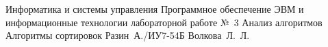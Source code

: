 \documentclass{bmstu}[a4paper]
\begin{document}
	
	\makereporttitle
	{Информатика и системы управления} %
	{Программное обеспечение ЭВМ и информационные технологии} %
	{лабораторной работе №~3} %
	{Анализ алгоритмов} %
	{Алгоритмы сортировок} %
	{} %
	{Разин~А./ИУ7-54Б} %
	{Волкова~Л.~Л.} %
	
	\maketableofcontents
	
	
	
	
	
	
	
	
	
	\makebibliography
	
	
	
	
\end{document}
